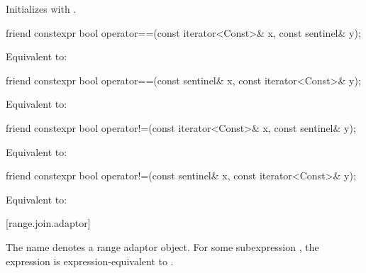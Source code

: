 \begin{itemdescr}
\pnum
\effects Initializes  with .
\end{itemdescr}

\begin{itemdecl}
friend constexpr bool operator==(const iterator<Const>& x, const sentinel& y);
\end{itemdecl}

\begin{itemdescr}
\pnum
\effects Equivalent to: 
\end{itemdescr}

\begin{itemdecl}
friend constexpr bool operator==(const sentinel& x, const iterator<Const>& y);
\end{itemdecl}

\begin{itemdescr}
\pnum
\effects Equivalent to: 
\end{itemdescr}

\begin{itemdecl}
friend constexpr bool operator!=(const iterator<Const>& x, const sentinel& y);
\end{itemdecl}

\begin{itemdescr}
\pnum
\effects Equivalent to: 
\end{itemdescr}

\begin{itemdecl}
friend constexpr bool operator!=(const sentinel& x, const iterator<Const>& y);
\end{itemdecl}

\begin{itemdescr}
\pnum
\effects Equivalent to: 
\end{itemdescr}

[range.join.adaptor]{}

\pnum
The name  denotes a
range adaptor object.
For some subexpression , the expression
 is expression-equivalent to
.


